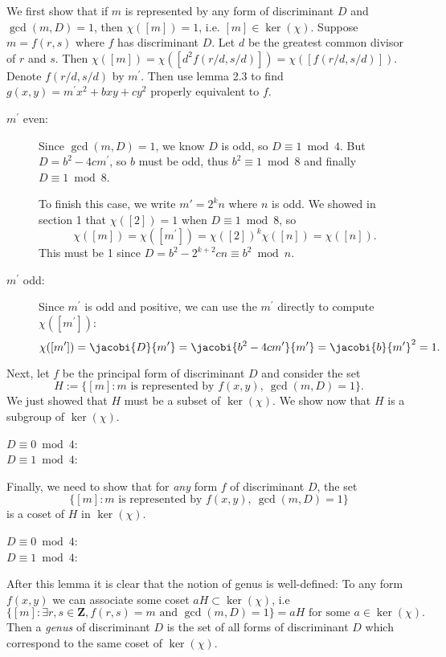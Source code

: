 We first show that if $m$ is represented by any form of discriminant $D$ and $\gcd(m,D)=1$, then $\chi([m])=1$, i.e. $[m]\in\ker(\chi)$. Suppose $m=f(r,s)$ where $f$ has discriminant $D$. Let $d$ be the greatest common divisor of $r$ and $s$. Then $\chi([m])=\chi([d^2f(r/d, s/d)])=\chi([f(r/d, s/d)]).$ Denote $f(r/d, s/d)$ by $m^\prime$. Then use lemma 2.3 to find $g(x,y)=m^\prime x^2+bxy+cy^2$ properly equivalent to $f$.
\begin{description}
  \item [$m^\prime$ even:]
    Since $\gcd(m, D)=1$, we know $D$ is odd, so $D\equiv 1\bmod 4$. But $D=b^2-4cm^\prime$, so $b$ must be odd, thus $b^2\equiv 1\bmod 8$ and finally $D\equiv 1\bmod 8$.

    To finish this case, we write $m\prime=2^kn$ where $n$ is odd. We showed in section 1 that $\chi([2])=1$ when $D\equiv 1\bmod 8$, so
    \[\chi([m])=\chi([m^\prime])=\chi([2])^k\chi([n])=\chi([n]).\]
    This must be 1 since $D=b^2-2^{k+2}cn\equiv b^2\bmod n$.

  \item [$m^\prime$ odd:]
    Since $m^\prime$ is odd and positive, we can use the $m^\prime$ directly to compute $\chi([m^\prime])$:
    \[\chi([m^\prime])=\jacobi{D}{m^\prime}=\jacobi{b^2-4cm^\prime}{m^\prime}=\jacobi{b}{m^\prime}^2=1.\]
\end{description}

Next, let $f$ be the principal form of discriminant $D$ and consider the set
\[H:=\{[m]: m\text{ is represented by }f(x,y),\ \gcd(m, D)=1\}.\]
We just showed that $H$ must be a subset of $\ker(\chi)$. We show now that $H$ is a subgroup of $\ker(\chi)$.
\begin{description}
  \item [$D\equiv 0\bmod 4$:]
  \item [$D\equiv 1\bmod 4$:]
\end{description}

Finally, we need to show that for \emph{any} form $f$ of discriminant $D$, the set
\[\{[m]: m\text{ is represented by }f(x,y),\ \gcd(m, D)=1\}\]
is a coset of $H$ in $\ker(\chi)$.
\begin{description}
  \item [$D\equiv 0\bmod 4$:]
  \item [$D\equiv 1\bmod 4$:]
\end{description}

After this lemma it is clear that the notion of genus is well-defined: To any form $f(x,y)$ we can associate some coset $aH\subset\ker(\chi)$, i.e
\[\{[m]:\exists r,s\in\mathbf{Z}, f(r,s)=m\text{ and }\gcd(m,D)=1\}=aH\text{ for some }a\in\ker(\chi).\]
Then a \emph{genus} of discriminant $D$ is the set of all forms of discriminant $D$ which correspond to the same coset of $\ker(\chi)$.
